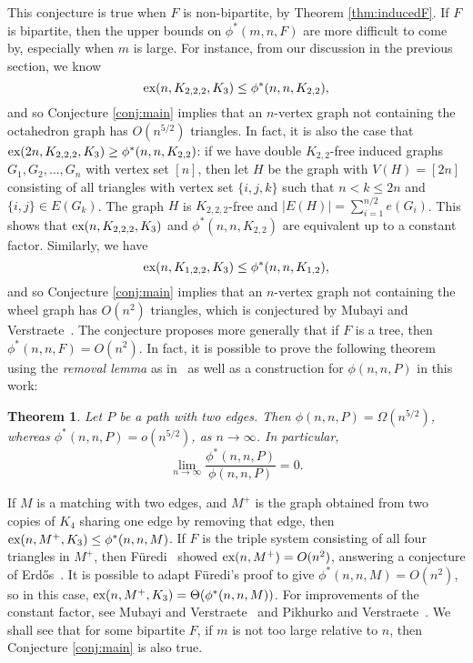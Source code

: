 \documentclass[12pt]{article}
\newtheorem{theorem}{Theorem}
\newcommand*{\ex}{\textnormal{ex}}
\begin{document}
This conjecture is true when $F$ is non-bipartite, by Theorem \ref{thm:inducedF}. If $F$ is bipartite, then the upper bounds on $\phi^*(m, n, F)$ are more difficult to come by, especially when $m$ is large. For instance, from our discussion in the previous section, we know 
\[ 
  \ex(n, K_{2,2,2}, K_3) \leq \phi^*(n, n, K_{2,2}),
\]
and so Conjecture \ref{conj:main} implies that an $n$-vertex graph not containing the octahedron graph has $O(n^{5/2})$ triangles. In fact, it is also the case that $\ex(2n, K_{2,2,2}, K_3) \geq \phi^*(n, n, K_{2,2})$: if we have double $K_{2,2}$-free induced graphs $G_1, G_2, \dots, G_{n}$ with vertex set $[n]$, then let $H$ be the graph with $V(H) = [2n]$ consisting of all triangles with vertex set $\{i, j, k\}$ such that $n < k \leq 2n$ and $\{i, j\} \in E(G_k)$. The graph $H$ is $K_{2, 2, 2}$-free and $|E(H)| = \sum_{i = 1}^{n/2} e(G_i)$. This shows that $\ex(n, K_{2,2,2}, K_3)$ and $\phi^*(n, n, K_{2,2})$ are equivalent up to a constant factor. Similarly, we have
\[ 
  \ex(n, K_{1, 2, 2}, K_3) \leq \phi^*(n, n, K_{1,2}),
\]
and so Conjecture \ref{conj:main} implies that an $n$-vertex graph not containing the wheel graph has $O(n^{2})$ triangles, which is conjectured by Mubayi and Verstraete~\cite{MubayiV2016}. The conjecture proposes more generally that if $F$ is a tree, then $\phi^*(n, n, F) = O(n^2)$. In fact, it is possible to prove the following theorem using the \textit{removal lemma} as in~\cite{MubayiMukherjee2023} as well as a construction for $\phi(n, n, P)$ in this work:

\begin{theorem}\label{thm:inducedP}
Let $P$ be a path with two edges. Then $\phi(n, n, P) = \Omega(n^{5/2})$, whereas $\phi^*(n, n, P) = o(n^{5/2})$, as $n \rightarrow \infty$. In particular, 
\[ 
  \lim_{n \rightarrow \infty} \frac{\phi^*(n, n, P)}{\phi(n, n, P)} = 0.
\]
\end{theorem}

If $M$ is a matching with two edges, and $M^+$ is the graph obtained from two copies of $K_4$ sharing one edge by removing that edge, then $\ex(n, M^+, K_3) \leq \phi^*(n, n, M)$. If $F$ is the triple system consisting of all four triangles in $M^+$, then F\"{u}redi~\cite{Furedi1984} showed $\ex(n, M^+) = O(n^2)$, answering a conjecture of Erd\H{o}s~\cite{Erdos1977}. It is possible to adapt F\"{u}redi's proof to give $\phi^*(n, n, M) = O(n^2)$, so in this case, $\ex(n, M^+, K_3) = \Theta(\phi^*(n, n, M))$. For improvements of the constant factor, see Mubayi and Verstraete~\cite{MubayiV2004} and Pikhurko and Verstraete~\cite{PikhurkoV2009}. We shall see that for some bipartite $F$, if $m$ is not too large relative to $n$, then Conjecture \ref{conj:main} is also true. 
\end{document}
